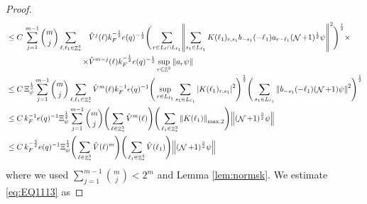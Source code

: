 \documentclass[sn-mathphys, Numbered ,a4paper]{sn-jnl}%
\DeclareMathOperator{\Z}{\mathbb{Z}}
\DeclareMathOperator{\NN}{\mathcal{N}}
\newcommand{\half}{\frac{1}{2}}
\theoremstyle{plain}
\theoremstyle{definition}
\theoremstyle{remark}
\theoremstyle{plain}
\theoremstyle{definition}
\theoremstyle{remark}
\begin{document}
\begin{proof}
\begin{alignat}{2}
	&\leq C\, \sum\limits_{j=1}^{m-1} {{m}\choose j} \sum\limits_{\ell, \ell_1\in \Z^3_*} \begin{aligned}[t] &\hat{V}^j(\ell)k_F^{-\half}e(q)^{-\half}  \Bigg( \sum\limits_{r\in L_{\ell} \cap L_{\ell_1}}\! \norm{ \sum\limits_{ s_1 \in L_{\ell_1}}  K(\ell_1)_{r,s_1} b_{-s_1}(-\ell_1)  a_{r-\ell_1} (\NN+1)^\half \psi} ^2\Bigg)^\half \times \nonumber\\ \times & \hat{V}^{m-j}(\ell)k_F^{-\half}e(q)^{-\half} \sup_{r \in \Z^3}\norm{a_r\psi}\end{aligned} \nonumber\\
	&\leq C\, \Xi_{\psi}^\half \sum\limits_{j=1}^{m-1} {{m}\choose j} \sum\limits_{\ell, \ell_1\in \Z^3_*} \hat{V}^{m}(\ell)k_F^{-1}e(q)^{-1} \Bigg(\sup_{r \in L_{\ell_1}} \sum\limits_{ s_1 \in L_{\ell_1}}\abs{  K(\ell_1)_{r,s_1} }^2\Bigg)^\half \Bigg(  \sum\limits_{ s_1 \in L_{\ell_1}}\norm{   b_{-s_1}(-\ell_1)  (\NN+1)\psi} ^2\Bigg)^\half\nonumber\\
	&\leq C\,k_F^{-1}e(q)^{-1}\Xi_{\psi}^\half \sum\limits_{j=1}^{m-1} {{m}\choose j}\Bigg( \sum\limits_{\ell \in \Z^3_*} \hat{V}^{m}(\ell)\Bigg) \Bigg(\sum\limits_{ \ell_1\in \Z^3_*}\norm{  K(\ell_1)}_{\mathrm{max,2}}\Bigg)  \norm{(\NN+1)^\frac{3}{2} \psi} \nonumber\\
	&\leq C\, k_{F}^{-\frac{3}{2}}e(q)^{-1}\Xi_{\psi}^\half \Bigg(\sum\limits_{\ell \in \Z^3_*} \hat{V}(\ell)^{m} \Bigg) \Bigg(\sum\limits_{ \ell_1\in \Z^3_*}\hat{V}(\ell_1)\Bigg)  \norm{(\NN+1)^\frac{3}{2} \psi} \label{eq:estEQ1112}
\end{alignat} 
where we used $\sum\limits_{j=1}^{m-1} {{m}\choose j} < 2^{m} $ and Lemma \ref{lem:normsk}.
We estimate \eqref{eq:EQ1113} as
\begin{comment}
	\begin{align}*(2 max,2 squared)
		&\eqref{eq:EQ1113}\nonumber\\
		&\leq\sum\limits_{\ell, \ell_1\in \Z^3_*} \mathds{1}_{L_{\ell_1}}(q) \mathds{1}_{L_{\ell}}(q) \norm{\sum\limits_{s \in L_{\ell},s_1\in L_{\ell_1}} K^m(\ell)_{q,s}K(\ell_1)_{q,s_1} b_{-s_1}(-\ell_1) b_{s}(\ell) a_{q-\ell_1}\psi}\norm{ a_{q-\ell}\psi }\nonumber\\
		&\leq\sum\limits_{\ell, \ell_1\in \Z^3_*} \mathds{1}_{L_{\ell_1}}(q) \mathds{1}_{L_{\ell}}(q) \Bigg(\sum\limits_{s \in L_{\ell}}\abs{K^m(\ell)_{q,s}}^2\Bigg)^\half \Bigg(\sum\limits_{s \in L_{\ell}}\norm{\sum\limits_{s_1\in L_{\ell_1}} K(\ell_1)_{q,s_1} b_{-s_1}(-\ell_1) b_{s}(\ell) a_{q-\ell_1}\psi}^2\Bigg)^\half \norm{ a_{q-\ell}\psi }\nonumber\\

\end{comment}
\end{proof}
\end{document}
